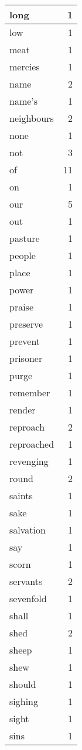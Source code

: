 \begin{center}
\begin{longtable}{l|r}
long & 1 \\ \hline
low & 1 \\ \hline
meat & 1 \\ \hline
mercies & 1 \\ \hline
name & 2 \\ \hline
name's & 1 \\ \hline
neighbours & 2 \\ \hline
none & 1 \\ \hline
not & 3 \\ \hline
of & 11 \\ \hline
on & 1 \\ \hline
our & 5 \\ \hline
out & 1 \\ \hline
pasture & 1 \\ \hline
people & 1 \\ \hline
place & 1 \\ \hline
power & 1 \\ \hline
praise & 1 \\ \hline
preserve & 1 \\ \hline
prevent & 1 \\ \hline
prisoner & 1 \\ \hline
purge & 1 \\ \hline
remember & 1 \\ \hline
render & 1 \\ \hline
reproach & 2 \\ \hline
reproached & 1 \\ \hline
revenging & 1 \\ \hline
round & 2 \\ \hline
saints & 1 \\ \hline
sake & 1 \\ \hline
salvation & 1 \\ \hline
say & 1 \\ \hline
scorn & 1 \\ \hline
servants & 2 \\ \hline
sevenfold & 1 \\ \hline
shall & 1 \\ \hline
shed & 2 \\ \hline
sheep & 1 \\ \hline
shew & 1 \\ \hline
should & 1 \\ \hline
sighing & 1 \\ \hline
sight & 1 \\ \hline
sins & 1 \\ \hline

\end{longtable}
\end{center}
